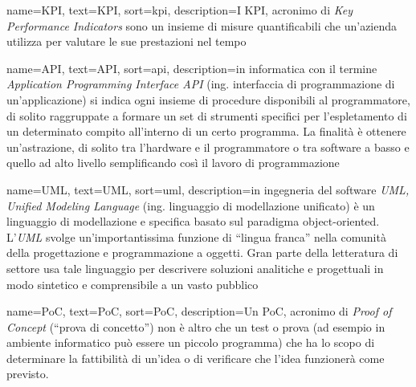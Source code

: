 
%




{
    name={KPI},
    text=KPI,
    sort=kpi,
    description={I KPI, acronimo di \emph{Key Performance Indicators} sono un insieme di misure quantificabili che un’azienda utilizza per valutare le sue prestazioni nel tempo}
}


{
    name={API},
    text=API,
    sort=api,
    description={in informatica con il termine \emph{Application Programming Interface API} (ing. interfaccia di programmazione di un'applicazione) si indica ogni insieme di procedure disponibili al programmatore, di solito raggruppate a formare un set di strumenti specifici per l'espletamento di un determinato compito all'interno di un certo programma. La finalità è ottenere un'astrazione, di solito tra l'hardware e il programmatore o tra software a basso e quello ad alto livello semplificando così il lavoro di programmazione}
}

{
    name={UML},
    text=UML,
    sort=uml,
    description={in ingegneria del software \emph{UML, Unified Modeling Language} (ing. linguaggio di modellazione unificato) è un linguaggio di modellazione e specifica basato sul paradigma object-oriented. L'\emph{UML} svolge un'importantissima funzione di ``lingua franca'' nella comunità della progettazione e programmazione a oggetti. Gran parte della letteratura di settore usa tale linguaggio per descrivere soluzioni analitiche e progettuali in modo sintetico e comprensibile a un vasto pubblico}
}

{
    name={PoC},
    text=PoC,
    sort=PoC,
    description={Un PoC, acronimo di \emph{Proof of Concept} (“prova di concetto”) non è altro che un test o prova (ad esempio in ambiente informatico può essere un piccolo programma) che ha lo scopo di determinare la fattibilità di un'idea o di verificare che l'idea funzionerà come previsto.}
}
